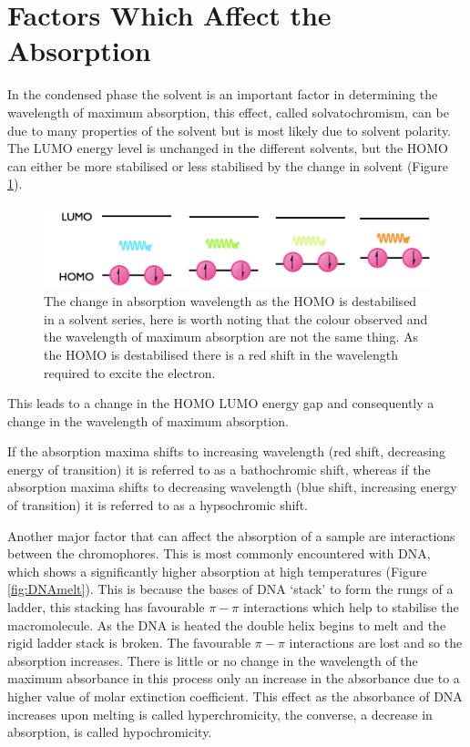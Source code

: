 \documentclass[
]{book}
\begin{document}
\hypertarget{factors-which-affect-the-absorption}{%
\section{Factors Which Affect the Absorption}\label{factors-which-affect-the-absorption}}

In the condensed phase the solvent is an important factor in determining the wavelength of maximum absorption, this effect, called solvatochromism, can be due to many properties of the solvent but is most likely due to solvent polarity. The LUMO energy level is unchanged in the different solvents, but the HOMO can either be more stabilised or less stabilised by the change in solvent (Figure \ref{fig:solvato}).

\begin{figure}

{\centering \includegraphics[width=1\linewidth]{images/Solvatochromism} 

}

\caption{The change in absorption wavelength as the HOMO is destabilised in a solvent series, here is worth noting that the colour observed and the wavelength of maximum absorption are not the same thing. As the HOMO is destabilised there is a red shift in the wavelength required to excite the electron.}\label{fig:solvato}
\end{figure}

This leads to a change in the HOMO LUMO energy gap and consequently a change in the wavelength of maximum absorption.

If the absorption maxima shifts to increasing wavelength (red shift, decreasing energy of transition) it is referred to as a bathochromic shift, whereas if the absorption maxima shifts to decreasing wavelength (blue shift, increasing energy of transition) it is referred to as a hypsochromic shift.

Another major factor that can affect the absorption of a sample are interactions between the chromophores. This is most commonly encountered with DNA, which shows a significantly higher absorption at high temperatures (Figure \ref{fig:DNAmelt}). This is because the bases of DNA `stack' to form the rungs of a ladder, this stacking has favourable \(\pi - \pi\) interactions which help to stabilise the macromolecule. As the DNA is heated the double helix begins to melt and the rigid ladder stack is broken. The favourable \(\pi - \pi\) interactions are lost and so the absorption increases. There is little or no change in the wavelength of the maximum absorbance in this process only an increase in the absorbance due to a higher value of molar extinction coefficient. This effect as the absorbance of DNA increases upon melting is called hyperchromicity, the converse, a decrease in absorption, is called hypochromicity.
\end{document}
